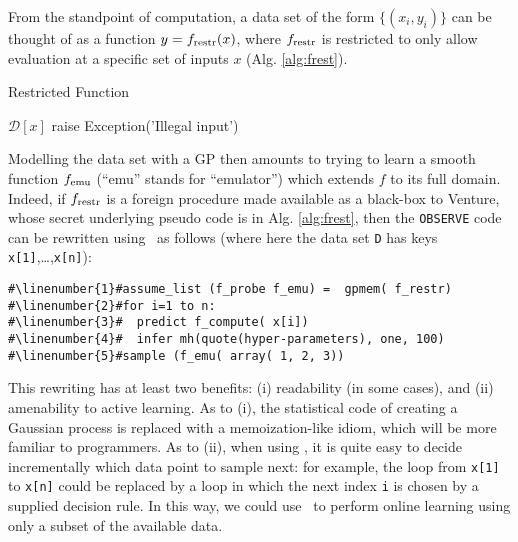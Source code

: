 \label{sec:special-case-gpmem}
From the standpoint of computation, a data set of the form $\{(x_i, y_i)\}$ can be thought of as a function $y = f_{\textrm{restr}}(x)$, where $f_{\textrm{restr}}$ is restricted to only allow evaluation at a specific set of inputs $x$ (Alg. \ref{alg:frest}).
\begin{algorithm}

\caption{Restricted Function}

\begin{algorithmic}[1]

 \State \Return $\mathcal{D}[x]$
\Else
 \State raise Exception('Illegal input')
\EndIf 
\EndFunction

\end{algorithmic}
  \label{alg:frest}


\end{algorithm}


Modelling the data set with a GP then amounts to trying to learn a smooth function $f_{\textrm{emu}}$ (``emu'' stands for ``emulator'') which extends $f$ to its full domain.
Indeed, if $f_{\textrm{restr}}$ is a foreign procedure made available as a black-box to Venture, whose secret underlying pseudo code is in Alg. \ref{alg:frest},
then the \texttt{OBSERVE} code can be rewritten using \gpmem\ as follows (where here the data set \texttt{D} has keys \texttt{x[1]},\ldots,\texttt{x[n]}):
\begin{mdframed}
\begin{minipage}{0.9\linewidth}

\begin{lstlisting}[mathescape,label=alg:venfrest,basicstyle=\selectfont\ttfamily,numbers=none,caption={Observation with \gpmem},escapechar=\#]
#\linenumber{1}#assume_list (f_probe f_emu) =  gpmem( f_restr)
#\linenumber{2}#for i=1 to n:
#\linenumber{3}#  predict f_compute( x[i])
#\linenumber{4}#  infer mh(quote(hyper-parameters), one, 100)
#\linenumber{5}#sample (f_emu( array( 1, 2, 3))
\end{lstlisting}
\end{minipage}
\end{mdframed}


\vspace{0.2cm}
This rewriting has at least two benefits: (i) readability (in some cases), and (ii) amenability to active learning.
As to (i), the statistical code of creating a Gaussian process is replaced with a memoization-like idiom, which will be more familiar to programmers.
As to (ii), when using \gpmem, it is quite easy to decide incrementally which data point to sample next: for example, the loop from \texttt{x[1]} to \texttt{x[n]} could be replaced by a loop in which the next index \texttt{i} is chosen by a supplied decision rule.
In this way, we could use \gpmem\ to perform online learning using only a subset of the available data.

